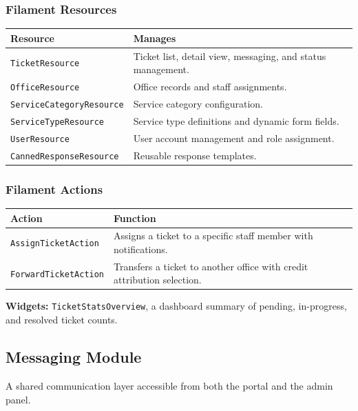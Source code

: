 \documentclass[12pt,a4paper]{article}
\newcommand{\code}[1]{\texttt{#1}}
\begin{document}
\subsubsection*{Filament Resources}
\begin{table}[h]
\centering
\begin{tabularx}{\textwidth}{@{} l Y @{}}
\toprule
\textbf{Resource} & \textbf{Manages} \\
\midrule
\code{TicketResource} & Ticket list, detail view, messaging, and status management. \\
\code{OfficeResource} & Office records and staff assignments. \\
\code{ServiceCategoryResource} & Service category configuration. \\
\code{ServiceTypeResource} & Service type definitions and dynamic form fields. \\
\code{UserResource} & User account management and role assignment. \\
\code{CannedResponseResource} & Reusable response templates. \\
\bottomrule
\end{tabularx}
\end{table}

\subsubsection*{Filament Actions}
\begin{table}[h]
\centering
\begin{tabularx}{\textwidth}{@{} l Y @{}}
\toprule
\textbf{Action} & \textbf{Function} \\
\midrule
\code{AssignTicketAction} & Assigns a ticket to a specific staff member with notifications. \\
\code{ForwardTicketAction} & Transfers a ticket to another office with credit attribution selection. \\
\bottomrule
\end{tabularx}
\end{table}

\textbf{Widgets:} \code{TicketStatsOverview}, a dashboard summary of pending, in-progress, and resolved ticket counts.

\subsection{Messaging Module}

A shared communication layer accessible from both the portal and the admin panel.
\end{document}
